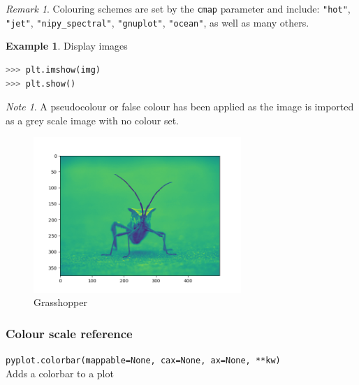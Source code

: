 \documentclass{article}
\theoremstyle{definition}
\newtheorem{ex}{Example}[subsection]
\theoremstyle{remark}
\newtheorem*{rem}{Remark}
\newtheorem*{nb}{Note}
\newcommand{\func}[2]{\noindent\lstinline{#1}\\#2}
\begin{document}
\begin{rem}
    Colouring schemes are set by the \lstinline{cmap} parameter and include:
     \lstinline{"hot"},
     \lstinline{"jet"},
     \lstinline{"nipy_spectral"},
     \lstinline{"gnuplot"},
     \lstinline{"ocean"},
     as well as many others.
\end{rem}


\begin{ex}Display images
\begin{lstlisting}[language=Python]
>>> plt.imshow(img)
>>> plt.show()
\end{lstlisting}

\begin{nb}
A pseudocolour or false colour has been applied as the image is imported as a grey scale image with no colour set.
\end{nb}

\begin{figure}[H]
    \centering
    \includegraphics[width=0.7\textwidth]{matplotlib_img}
    \caption{Grasshopper}
    \label{fig:mpl_img}
\end{figure}
\end{ex}


\subsubsection{Colour scale reference}

\func{pyplot.colorbar(mappable=None, cax=None, ax=None, **kw)}{Adds a colorbar to a plot}
\end{document}
